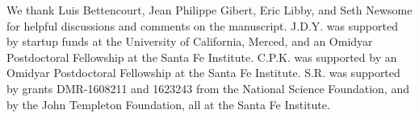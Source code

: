 \documentclass{pnastwo}
\begin{document}
\begin{article}
%
%



%





%
%
%
%
%








\begin{acknowledgments}
  We thank Luis Bettencourt, Jean Philippe Gibert, Eric Libby, and Seth Newsome for helpful
  discussions and comments on the manuscript.  J.D.Y. was supported by
  startup funds at the University of California, Merced, and an Omidyar
  Postdoctoral Fellowship at the Santa Fe Institute.  C.P.K. was supported by
  an Omidyar Postdoctoral Fellowship at the Santa Fe Institute.  S.R. was
  supported by grants DMR-1608211 and 1623243 from the National Science
  Foundation, and by the John Templeton Foundation, all at the Santa Fe
  Institute.
\end{acknowledgments}






\end{article}
\end{document}
